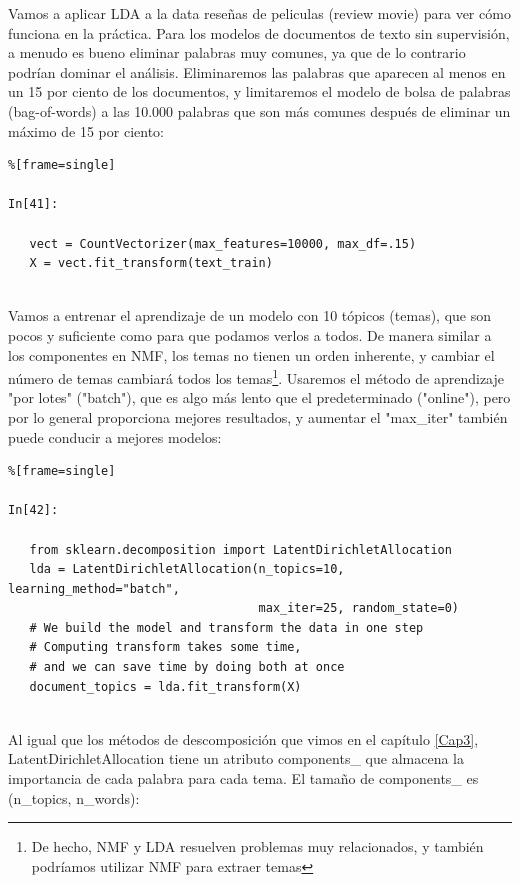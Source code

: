 Vamos a aplicar LDA a la data reseñas de peliculas (review  movie) para ver cómo 
funciona en la práctica. Para los modelos de documentos de texto sin supervisión, a menudo es bueno eliminar palabras muy comunes, ya que de lo contrario podrían dominar el análisis. Eliminaremos las palabras que aparecen  al menos en un 15 por ciento de los documentos, y limitaremos el modelo de bolsa de palabras (bag-of-words) a las 10.000 palabras que son más comunes después de eliminar un  máximo de  15 por ciento: 

\begin{lstlisting}%[frame=single]

In[41]:

   vect = CountVectorizer(max_features=10000, max_df=.15)
   X = vect.fit_transform(text_train)
   
\end{lstlisting}

Vamos a entrenar el aprendizaje  de  un modelo  con 10 tópicos (temas), que son pocos y suficiente
 como para que podamos verlos  a todos. De manera similar a los componentes en  NMF, 
los temas no tienen un orden inherente, y cambiar el número de temas cambiará todos los temas\footnote{De hecho, NMF y LDA resuelven problemas muy relacionados, y también podríamos utilizar NMF para extraer temas}.  Usaremos el método de aprendizaje "{}por lotes"{} ("{}batch"{}),  que es algo más lento 
que el predeterminado  ("{}online"{}),  pero por lo general proporciona mejores resultados, y aumentar  el \:  "{}{\ttfamily max\_iter}"{}    también puede conducir a mejores modelos:

\begin{lstlisting}%[frame=single]

In[42]:

   from sklearn.decomposition import LatentDirichletAllocation
   lda = LatentDirichletAllocation(n_topics=10, learning_method="batch",
                                   max_iter=25, random_state=0)
   # We build the model and transform the data in one step
   # Computing transform takes some time,
   # and we can save time by doing both at once
   document_topics = lda.fit_transform(X)
   
\end{lstlisting}

Al igual que los métodos de descomposición que vimos en el capítulo \ref{Cap3}, {\ttfamily LatentDirichletAllocation}  tiene un atributo {\ttfamily components\_} que almacena la
 importancia de cada palabra para cada tema. El tamaño de  {\ttfamily components\_} \: es  
 {\ttfamily (n\_topics, n\_words)}:

